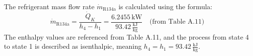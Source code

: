 The refrigerant mass flow rate \( \dot{m}_{\text{R134a}} \) is calculated using the formula:  
\[
\dot{m}_{\text{R134a}} = \frac{\dot{Q}_K}{h_{4} - h_{1}} = \frac{6.2455 \, \text{kW}}{93.42 \, \frac{\text{kJ}}{\text{kg}}} \quad \text{(from Table A.11)}
\]  
The enthalpy values are referenced from Table A.11, and the process from state 4 to state 1 is described as isenthalpic, meaning \( h_4 = h_1 = 93.42 \, \frac{\text{kJ}}{\text{kg}} \).